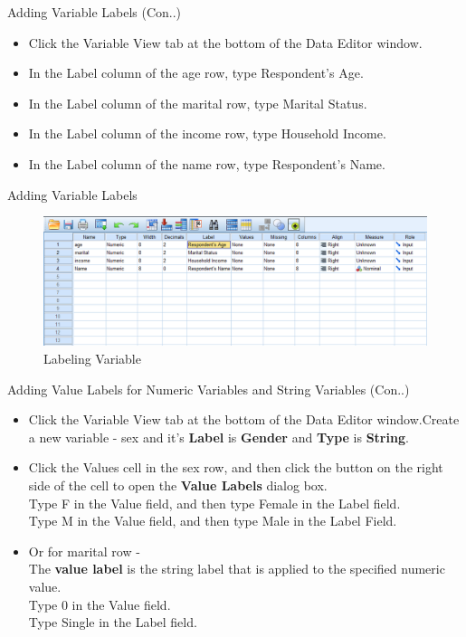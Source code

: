 \begin{frame}[t]{Adding Variable Labels (Con..)}
	\begin{itemize}
		\item Click the Variable View tab at the bottom of the Data Editor window.
		\item In the Label column of the age row, type Respondent's Age.
		\item In the Label column of the marital row, type Marital Status.
		\item In the Label column of the income row, type Household Income.
		\item In the Label column of the name row, type Respondent's Name.
	\end{itemize}
\end{frame}
\begin{frame}[t]{Adding Variable Labels}
	\begin{figure}
	\centering
	\includegraphics[width=14cm]{img/labeling}
	\caption{Labeling Variable}
	\end{figure}
\end{frame}
\begin{frame}[t]{Adding Value Labels for Numeric Variables and String Variables (Con..)}
	\begin{itemize}
		\item Click the Variable View tab at the bottom of the Data Editor window.Create a new variable - sex and it's \textbf{Label} is \textbf{Gender} and \textbf{Type} is \textbf{String}.
		
		\item Click the Values cell in the sex row, and then click the button on the right side of the cell to open the \textbf{Value Labels} dialog box.\\
		Type F in the Value field, and then type Female in the Label field.\\
		Type M in the Value field, and then type Male in the Label Field.
		
		\item Or for marital row -\\
		The \textbf{value label} is the string label that is applied to the specified numeric value.\\
		Type 0 in the Value field.\\
		Type Single in the Label field.
	\end{itemize}
\end{frame}
